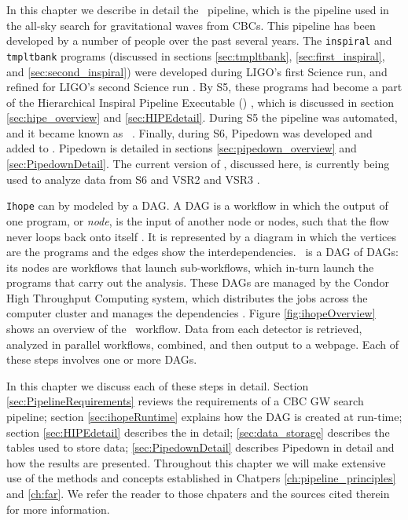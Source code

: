 
In this chapter we describe in detail the \ihope~pipeline, which is the
pipeline used in the all-sky search for gravitational waves from \acp{CBC}.
This pipeline has been developed by a number of people over the past several
years. The \texttt{inspiral} and \texttt{tmpltbank} programs (discussed in
sections \ref{sec:tmpltbank}, \ref{sec:first_inspiral}, and
\ref{sec:second_inspiral}) were developed during \ac{LIGO}'s first Science run,
and refined for \ac{LIGO}'s second Science run \cite{Allen:2005fk,
brown-2005-22}. By \ac{S5}, these programs had become a part of the
Hierarchical Inspiral Pipeline Executable (\hipe) \cite{Collaboration:2009tt,
Keppel:thesis}, which is discussed in section \ref{sec:hipe_overview} and
\ref{sec:HIPEdetail}. During \ac{S5} the pipeline was automated, and it
became known as \ihope~\cite{Abbott:2009qj}. Finally, during \ac{S6}, Pipedown
was developed and added to \ihope. Pipedown is detailed in sections
\ref{sec:pipedown_overview} and \ref{sec:PipedownDetail}. The current version of
\ihope, discussed here, is currently being used to analyze data from \ac{S6} and
\ac{VSR2} and \ac{VSR3} \cite{Collaboration:S6CBClowmass}.

\verb|Ihope| can by modeled by a \ac{DAG}. A \ac{DAG} is a workflow in which
the output of one program, or {\it node}, is the input of another node or
nodes, such that the flow never loops back onto itself \cite{brown-2005-22}. It
is represented by a diagram in which the vertices are the programs and the
edges show the interdependencies. \ihope~is a \ac{DAG} of \ac{DAG}s: its nodes
are workflows that launch sub-workflows, which in-turn launch the programs that
carry out the analysis. These \ac{DAG}s are managed by the Condor High
Throughput Computing system, which distributes the jobs across the computer
cluster and manages the dependencies \cite{beowulfbook-condor}. Figure
\ref{fig:ihopeOverview} shows an overview of the \ihope~workflow. Data from
each detector is retrieved, analyzed in parallel workflows, combined, and then
output to a webpage. Each of these steps involves one or more \ac{DAG}s.

In this chapter we discuss each of these steps in detail. Section
\ref{sec:PipelineRequirements} reviews the requirements of a \ac{CBC} \ac{GW}
search pipeline; section \ref{sec:ihopeRuntime} explains how the \ac{DAG} is
created at run-time; section \ref{sec:HIPEdetail} describes the in detail; \ref{sec:data_storage}
describes the tables used to store data; \ref{sec:PipedownDetail} describes
Pipedown in detail and how the results are presented. Throughout this chapter
we will make extensive use of the methods and concepts established in Chatpers
\ref{ch:pipeline_principles} and \ref{ch:far}. We refer the reader to those
chpaters and the sources cited therein for more information.

